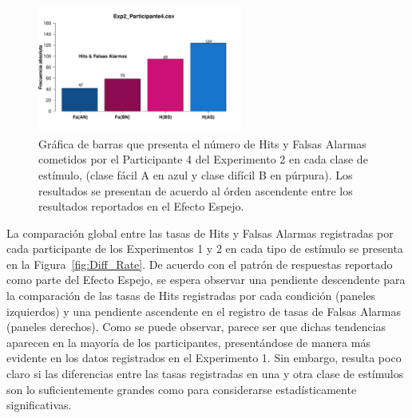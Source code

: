 \begin{figure}[th]
\centering
\includegraphics[width=0.60\textwidth]{Figures/MirrorRate_Exp2_P4}
\caption[Diferencias entre Hits y Falsas Alarmas por Condición; Participante ejemplar]{Gráfica de barras que presenta el número de Hits y Falsas Alarmas cometidos por el Participante 4 del Experimento 2 en cada clase de estímulo, (clase fácil A en azul y clase difícil B en púrpura). Los resultados se presentan de acuerdo al órden ascendente entre los resultados reportados en el Efecto Espejo.}
\label{fig:MirrorRate_E2_P4}
\end{figure}


La comparación global entre las tasas de Hits y Falsas Alarmas registradas por cada participante de los Experimentos 1 y 2 en cada tipo de estímulo se presenta en la Figura~\ref{fig:Diff_Rate}. De acuerdo con el patrón de respuestas reportado como parte del Efecto Espejo, se espera observar una pendiente descendente para la comparación de las tasas de Hits registradas por cada condición (paneles izquierdos) y una pendiente ascendente en el registro de tasas de Falsas Alarmas (paneles derechos). Como se puede observar, parece ser que dichas tendencias aparecen en la mayoría de los participantes, presentándose de manera más evidente en los datos registrados en el Experimento 1. Sin embargo, resulta poco claro si las diferencias entre las tasas registradas en una y otra clase de estímulos son lo suficientemente grandes como para considerarse estadísticamente significativas.\\


